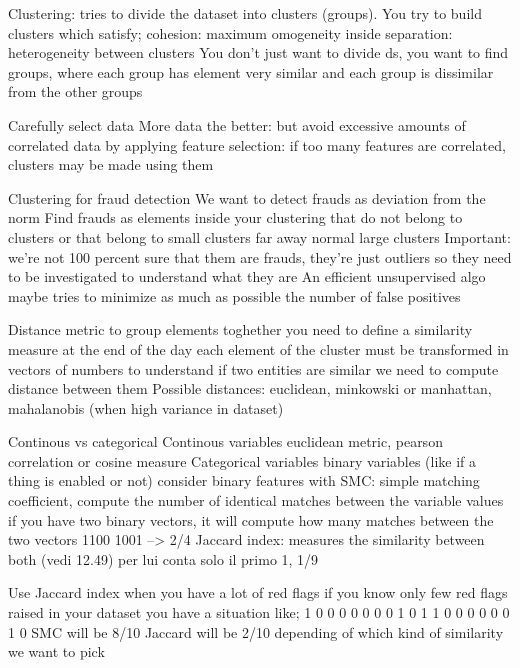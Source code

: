 \iffalse
Clustering:
    tries to divide the dataset into clusters (groups). 
    You try to build clusters which satisfy;
        cohesion: maximum omogeneity inside
        separation: heterogeneity between clusters 
    You don't just want to divide ds, you want to find groups, where each group
    has element very similar and each group is dissimilar from the other groups

    Carefully select data 
    More data the better: but avoid excessive amounts of correlated data by applying
    feature selection: if too many features are correlated, clusters may be made using them 

    Clustering for fraud detection
        We want to detect frauds as deviation from the norm
        Find frauds as elements inside your clustering that do not belong to clusters
        or that belong to small clusters far away normal large clusters 
        Important: we're not 100 percent sure that them are frauds, they're just outliers
            so they need to be investigated to understand what they are 
            An efficient unsupervised algo maybe tries to minimize as much as possible the number of false positives

    Distance metric
        to group elements toghether you need to define a similarity measure
        at the end of the day each element of the cluster must be transformed in vectors of numbers 
        to understand if two entities are similar we need to compute distance between them 
        Possible distances:
            euclidean, minkowski or manhattan, mahalanobis (when high variance in dataset)

        Continous vs categorical 
            Continous variables
                euclidean metric, pearson correlation or cosine measure 
            Categorical variables
                binary variables (like if a thing is enabled or not)
                    consider binary features with
                    SMC: simple matching coefficient, compute the number of identical matches between the variable values
                        if you have two binary vectors, it will compute how many matches between the two vectors 
                        1100 1001 --> 2/4
                    Jaccard index: measures the similarity between both (vedi 12.49) per lui conta solo il primo 1, 1/9

                    Use Jaccard index when you have a lot of red flags 
                        if you know only few red flags raised in your dataset you have a situation like;
                            1 0 0 0 0 0 0 0 1 0
                            1 1 0 0 0 0 0 0 1 0
                            SMC will be 8/10
                            Jaccard will be 2/10
                        depending of which kind of similarity we want to pick 
        
